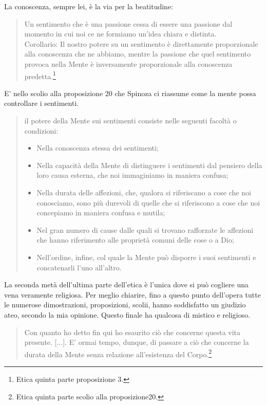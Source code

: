 La conoscenza, sempre lei, è la via per la beatitudine:

\begin{quotation}
	\small Un sentimento che è una passione cessa di essere una passione dal momento in cui noi
	ce ne formiamo un’idea chiara e distinta.\\
	Corollario: Il nostro potere su un sentimento è direttamente proporzionale alla conoscenza che ne abbiamo, mentre la passione che quel sentimento provoca nella Mente è inversamente proporzionale alla conoscenza predetta.\footnote{Etica quinta parte proposizione 3.}
\end{quotation}

E' nello scolio alla proposizione 20 che Spinoza ci riassume come la mente possa controllare i sentimenti.

\begin{quotation}
	\small il potere
	della Mente sui sentimenti consiste nelle seguenti facoltà o condizioni: 
	
	\begin{itemize}
	\item Nella conoscenza
	stessa dei sentimenti;\item  Nella capacità della Mente di distinguere i sentimenti dal pensiero
	della loro causa esterna, che noi immaginiamo in maniera confusa;\item Nella durata delle affezioni, che, qualora si riferiscano a cose che noi conosciamo, sono più durevoli di quelle
	che si riferiscono a cose che noi concepiamo in maniera confusa e mutila;\item Nel gran numero di cause dalle quali si trovano rafforzate le affezioni che hanno riferimento alle proprietà comuni delle cose o a Dio;\item Nell’ordine, infine, col quale la Mente può disporre i
	suoi sentimenti e concatenarli l’uno all’altro.
\end{itemize}
\end{quotation}

La seconda metà dell'ultima parte dell'etica è l'unica dove si può cogliere una vena veramente religiosa. Per meglio chiarire, fino a questo punto dell'opera tutte le numerose dimostrazioni, proposizioni, scolii, hanno soddisfatto un giudizio ateo, secondo la mia opinione. Questo finale ha qualcosa di mistico e religioso.

\begin{quotation}
	\small Con quanto ho detto fin qui ho esaurito ciò che concerne questa vita presente. [...]. E’ ormai tempo, dunque, di passare a ciò che concerne la durata della
	Mente senza relazione all’esistenza del Corpo.\footnote{Etica quinta parte scolio alla proposizione20.}
\end{quotation}

